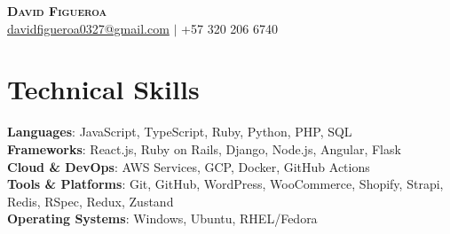 \documentclass[letterpaper,11pt]{article}
\begin{document}
\begin{center}
    \textbf{\Huge \scshape David Figueroa} \\ \vspace{6pt}
    \small
\href{mailto:davidfigueroa0327@gmail.com}{davidfigueroa0327@gmail.com} $|$ +57 320 206 6740\end{center}
\vspace{6pt}




\section{Technical Skills}
 \begin{itemize}[leftmargin=0.15in, label={}]
    \small{\item{
     \textbf{Languages}{: JavaScript, TypeScript, Ruby, Python, PHP, SQL} \\     \textbf{Frameworks}{: React.js, Ruby on Rails, Django, Node.js, Angular, Flask} \\     \textbf{Cloud \& DevOps}{: AWS Services, GCP, Docker, GitHub Actions} \\     \textbf{Tools \& Platforms}{: Git, GitHub, WordPress, WooCommerce, Shopify, Strapi, Redis, RSpec, Redux, Zustand} \\     \textbf{Operating Systems}{: Windows, Ubuntu, RHEL/Fedora}    }}
 \end{itemize}


\end{document}

